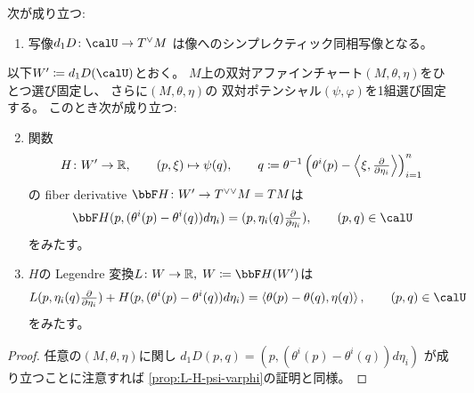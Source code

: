 \documentclass[report]{jlreq}
\begin{document}
\begin{proposition}
    次が成り立つ:
    \begin{enumerate}
        \item 写像$d_1 D \colon \calU \to T^\vee M$
            は像へのシンプレクティック同相写像となる。
    \end{enumerate}
    以下$W' \coloneqq d_1 D(\calU)$とおく。
    $M$上の双対アファインチャート$(M, \theta, \eta)$をひとつ選び固定し、
    さらに$(M, \theta, \eta)$の
    双対ポテンシャル$(\psi, \varphi)$を1組選び固定する。
    このとき次が成り立つ:
    \begin{enumerate}
        \setcounter{enumi}{1}
        \item 関数
            \begin{equation}
                H \colon W' \to \R,
                    \qquad
                    (p, \xi) \mapsto \psi(q),
                    \qquad
                    q \coloneqq \theta^{-1}\myparen{
                        \theta^i(p)
                        -
                        \myangle{\xi}{\tdeldel{\eta_i}}
                    }_{i = 1}^n
            \end{equation}
            の fiber derivative $\bbF H \colon W' \to T^{\vee\vee} M = TM$は
            \begin{equation}
                \bbF H(p, (\theta^i(p) - \theta^i(q)) d\eta_i)
                    =
                        (p, \eta_i(q) \tdeldel{\eta_i}),
                        \qquad
                        (p, q) \in \calU
            \end{equation}
            をみたす。
        \item $H$の Legendre 変換$L \colon W \to \R, \; W \coloneqq \bbF H(W')$は
            \begin{equation}
                L(p, \eta_i(q) \tdeldel{\eta_i})
                    + H(p, (\theta^i(p) - \theta^i(q)) d\eta_i)
                    =
                        \myangle{\theta(p) - \theta(q)}{\eta(q)},
                        \qquad
                        (p, q) \in \calU
            \end{equation}
            をみたす。
    \end{enumerate}
\end{proposition}

\begin{proof}
    任意の$(M, \theta, \eta)$に関し
    $d_1 D(p, q) = (p, (\theta^i(p) - \theta^i(q)) d\eta_i)$
    が成り立つことに注意すれば
    \cref{prop:L-H-psi-varphi}の証明と同様。
\end{proof}
\end{document}
